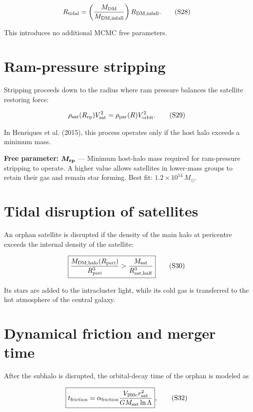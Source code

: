\documentclass[11pt,a4paper]{article}
\newcommand{\freeparam}[2]{%
  \colorbox{freeblue}{\parbox{0.95\linewidth}{\textbf{Free parameter:} $\boldsymbol{#1}$ --- #2}}%
}
\begin{document}
\begin{equation}
 R_{\rm tidal}=\left(\frac{M_{\rm DM}}{M_{\rm DM,infall}}\right)R_{\rm DM,infall}.
 \tag{S28}
\end{equation}

This introduces no additional MCMC free parameters.

\section{Ram-pressure stripping}
Stripping proceeds down to the radius where ram pressure balances the satellite restoring force:

\begin{equation}
 \rho_{\rm sat}(R_{\rm rp})V_{\rm sat}^2
 =\rho_{\rm par}(R)V_{\rm orbit}^2.
 \tag{S29}
\end{equation}

In Henriques et al. (2015), this process operates only if the host halo exceeds a minimum mass.

\freeparam{M_{\rm rp}}{Minimum host-halo mass required for ram-pressure stripping to operate. A higher value allows satellites in lower-mass groups to retain their gas and remain star forming. Best fit: $1.2\times10^{14}\,M_\odot$.}

\section{Tidal disruption of satellites}
An orphan satellite is disrupted if the density of the main halo at pericentre exceeds the internal density of the satellite:

\begin{equation}
 \boxed{
 \frac{M_{\rm DM,halo}(R_{\rm peri})}{R_{\rm peri}^3}
 >
 \frac{M_{\rm sat}}{R_{\rm sat,half}^3}}
 \tag{S30}
\end{equation}

Its stars are added to the intracluster light, while its cold gas is transferred to the hot atmosphere of the central galaxy.

\section{Dynamical friction and merger time}
After the subhalo is disrupted, the orbital-decay time of the orphan is modeled as

\begin{equation}
 \boxed{t_{\rm friction}=\alpha_{\rm friction}
 \frac{V_{200c}r_{\rm sat}^2}
 {GM_{\rm sat}\ln\Lambda}},
 \tag{S32}
\end{equation}
\end{document}
